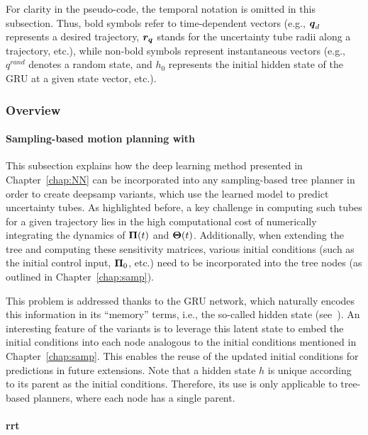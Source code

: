 For clarity in the pseudo-code, the temporal notation is omitted in this subsection. 
Thus, bold symbols refer to time-dependent vectors (e.g., $\boldsymbol{q}_d$ represents a desired trajectory, $\boldsymbol{r_q}$ stands for the uncertainty tube radii along a trajectory, etc.), while non-bold symbols represent instantaneous vectors (e.g., $q^{rand}$ denotes a random state, and $h_0$ represents the initial hidden state of the GRU at a given state vector, etc.).

\subsubsection{Overview}

\paragraph{Sampling-based motion planning with }

This subsection explains how the deep learning method presented in Chapter~\ref{chap:NN} can be incorporated into any sampling-based tree planner in order to create \gls{deepsamp} variants, which use the learned model to predict uncertainty tubes.
As highlighted before, a key challenge in computing such tubes for a given trajectory lies in the high computational cost of numerically integrating the dynamics of $\boldsymbol{\Pi}(t)$ and $\boldsymbol{\Theta}(t)$.
Additionally, when extending the tree and computing these sensitivity matrices, various initial conditions (such as the initial control input, $\boldsymbol{\Pi}_0$, etc.) need to be incorporated into the tree nodes (as outlined in Chapter~\ref{chap:samp}).

This problem is addressed thanks to the GRU network, which naturally encodes this information in its ``memory'' terms, i.e., the so-called hidden state (see~\cite{cGRU}).
An interesting feature of the  variants is to leverage this latent state to embed the initial conditions into each node analogous to the  initial conditions mentioned in Chapter~\ref{chap:samp}. 
This enables the reuse of the updated initial conditions for predictions in future extensions.
Note that a hidden state $h$ is unique according to its parent as the  initial conditions.
Therefore, its use is only applicable to tree-based planners, where each node has a single parent.

\paragraph{\gls{rrt}}

